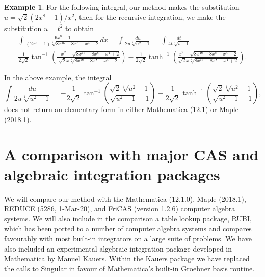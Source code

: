 \documentclass[12pt]{article}
\numberwithin{equation}{section}
\theoremstyle{definition}
\newtheorem{example}{Example}[section]
\begin{document}
\begin{example}
For the following integral, our method makes the substitution 
$u = \sqrt{2}\left(2x^8-1\right)/x^2$, then for the recursive integration, we make 
the substitution $u = t^2$ to obtain 
\begin{multline*}
\int \frac{6 x^8+1}{\left(2 x^8-1\right) \sqrt[4]{8 x^{16}-8 x^8-x^4+2}} dx =
 \int\frac{du}{2 u \sqrt[4]{u^2-1}} = \int \frac{dt}{4 t \sqrt[4]{t-1}} = \\
\frac{1}{2 \sqrt{2}} \tan ^{-1}\left(\frac{-x^2+\sqrt{8 x^{16}-8 x^8-x^4+2}}{\sqrt{2} x \sqrt[4]{8 x^{16}-8x^8-x^4+2}}\right) - 
\frac{1}{2 \sqrt{2}} \tanh ^{-1}\left(\frac{x^2+\sqrt{8 x^{16}-8x^8-x^4+2}}{\sqrt{2} x \sqrt[4]{8 x^{16}-8 x^8-x^4+2}}\right).
\end{multline*}
\end{example}

In the above example, the integral 
$$\int\frac{du}{2 u \sqrt[4]{u^2-1}} = 
-\frac{1}{2\sqrt{2}} \tan ^{-1}\left(\frac{\sqrt{2} \sqrt[4]{u^2-1}}{\sqrt{u^2-1}-1}\right) - 
\frac{1}{2\sqrt{2}} \tanh ^{-1}\left(\frac{\sqrt{2} \sqrt[4]{u^2-1}}{\sqrt{u^2-1}+1}\right),$$ 
does not return an elementary form in either Mathematica (12.1) or Maple (2018.1).

\section{A comparison with major CAS and algebraic integration packages}

We will compare our method with the Mathematica (12.1.0), Maple (2018.1), REDUCE (5286, 1-Mar-20), 
and FriCAS (version 1.2.6) computer algebra systems. We will also include in the comparison a table 
lookup package, RUBI\cite{Rich2018}, which has been ported to a number of computer algebra systems 
and compares favourably with most built-in integrators on a large suite of problems\cite{rubi_results}. 
We have also included an experimental algebraic integration package developed in Mathematica by Manuel 
Kauers\cite{Kauers2008}. Within the Kauers package we have replaced the calls to Singular in favour
of Mathematica's built-in Groebner basis routine.\\
\end{document}
